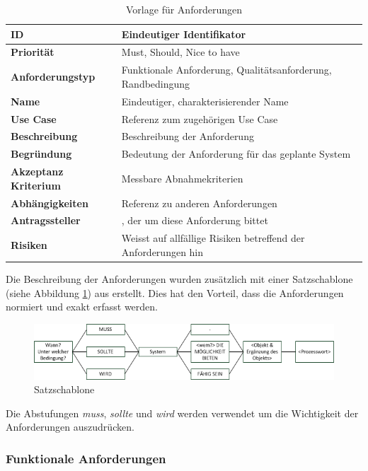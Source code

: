 \begin{table}[ht]
\centering
  \begin{tabular}{ l | p{8cm} }
	\hline
	\rowcolor{gray}
	\textbf{ID}			&	Eindeutiger Identifikator\\ \hline
	\textbf{Priorität} 		&	Must, Should, Nice to have\\ \hline
	\textbf{Anforderungstyp}	&	Funktionale Anforderung, Qualitätsanforderung, Randbedingung\\ \hline
	\textbf{Name} 			&	Eindeutiger, charakterisierender Name\\ \hline
	\textbf{Use Case} 		&	Referenz zum zugehörigen Use Case\\ \hline
	\textbf{Beschreibung} 	&	Beschreibung der Anforderung\\ \hline
	\textbf{Begründung} 		&	Bedeutung der Anforderung für das geplante System\\ \hline
	\textbf{Akzeptanz Kriterium}	&	Messbare Abnahmekriterien\\ \hline
	\textbf{Abhängigkeiten} 	&	Referenz zu anderen Anforderungen\\ \hline
	\textbf{Antragssteller} 	&	\glossarmark{Stakeholder}, der um diese Anforderung bittet\\ \hline
	\textbf{Risiken}	 	&	Weisst auf allfällige Risiken betreffend der Anforderungen hin
  \end{tabular}
   \caption{Vorlage für Anforderungen}\label{table:req_template}
\end{table}


Die Beschreibung der Anforderungen wurden zusätzlich mit einer Satzschablone (siehe Abbildung \ref{fig:satzschablone}) aus \cite{req_eng_book} erstellt. Dies hat den Vorteil, dass die Anforderungen normiert und exakt erfasst werden.
\begin{figure}[h]
\includegraphics{images/anforderungen/satzschablone.png}
\caption{Satzschablone}
\label{fig:satzschablone}
\end{figure}
\FloatBarrier
Die Abstufungen \emph{muss}, \emph{sollte} und \emph{wird} werden verwendet um die Wichtigkeit der Anforderungen auszudrücken.

\newpage
\FloatBarrier
\subsubsection{Funktionale Anforderungen}\label{func_anforderungen}

